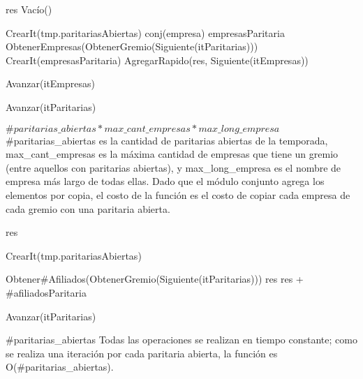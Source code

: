 {
	\state res \asig Vac\'io()		
	\state

	\state {} \asig CrearIt(tmp.paritariasAbiertas)		
							
		\state
		\state conj(empresa) empresasParitaria \asig ObtenerEmpresas(ObtenerGremio(Siguiente(itParitarias)))		
		\state
		\state {} \asig CrearIt(empresasParitaria)	
			
			\state
			\state AgregarRapido(res, Siguiente(itEmpresas))	
			
			\state
			\state Avanzar(itEmpresas)	
		\endwhile

		\state
		\state Avanzar(itParitarias)						
	\endwhile
}
{ \ensuremath{\#paritarias\_abiertas * max\_cant\_empresas * max\_long\_empresa }}
{ \#paritarias\_abiertas es la cantidad de paritarias abiertas de la temporada, max\_cant\_empresas es la m\'axima cantidad de empresas que tiene un gremio (entre aquellos con paritarias abiertas), y max\_long\_empresa es el nombre de empresa m\'as largo de todas ellas. Dado que el m\'odulo conjunto agrega los elementos por copia, el costo de la funci\'on es el costo de copiar cada empresa de cada gremio con una paritaria abierta. }

{
	\state res 		
	\state

	\state {} \asig CrearIt(tmp.paritariasAbiertas)		
						
		\state

		\state {} \asig Obtener\#Afiliados(ObtenerGremio(Siguiente(itParitarias)))		
		\state res \asig res + \#afiliadosParitaria		

		\state
		\state Avanzar(itParitarias)					
	\endwhile
}
{ \#paritarias\_abiertas }
{ Todas las operaciones se realizan en tiempo constante; como se realiza una iteraci\'on por cada paritaria abierta, la funci\'on es O(\#paritarias\_abiertas). }

